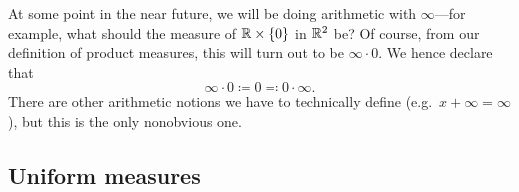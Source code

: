 \begin{displayquote}
At some point in the near future, we will be doing arithmetic with $\infty$---for example, what should the measure of $\mathbb{R} \times \{ 0\}$ in $\mathbb{R} ^2$ be?  Of course, from our definition of product measures, this will turn out to be $\infty \cdot 0$.  We hence declare that
\begin{equation}
\infty \cdot 0\coloneqq 0\eqqcolon 0\cdot \infty .
\end{equation}
There are other arithmetic notions we have to technically define (e.g.~$x+\infty=\infty$), but this is the only nonobvious one.
\end{displayquote}

\subsection{Uniform measures}

